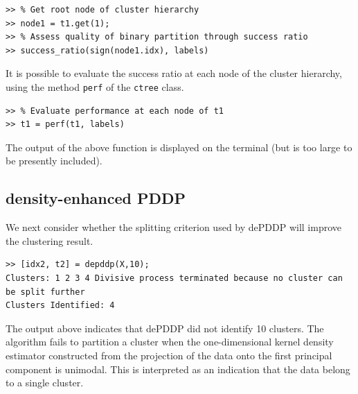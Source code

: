 \documentclass{book}
\begin{document}
\begin{verbatim}
>> % Get root node of cluster hierarchy
>> node1 = t1.get(1);
>> % Assess quality of binary partition through success ratio
>> success_ratio(sign(node1.idx), labels)
\end{verbatim}


It is possible to evaluate the success ratio at each node of the cluster hierarchy,
using the method {\tt perf} of the {\tt ctree} class. 

\begin{verbatim}
>> % Evaluate performance at each node of t1
>> t1 = perf(t1, labels)
\end{verbatim}

\noindent
The output of the above function is displayed on the terminal (but is
too large to be presently included).

\subsection{density-enhanced PDDP}

We next consider whether the splitting criterion used by dePDDP will
improve the clustering result.


\begin{verbatim}
>> [idx2, t2] = depddp(X,10);
Clusters: 1 2 3 4 Divisive process terminated because no cluster can be split further
Clusters Identified: 4
\end{verbatim}

\noindent
%
The output above indicates that dePDDP did not identify 10 clusters. The
algorithm fails to partition a cluster when the one-dimensional kernel density
estimator constructed from the projection of the data onto the first principal
component is unimodal. This is interpreted as an indication that the data belong
to a single cluster.
\end{document}
